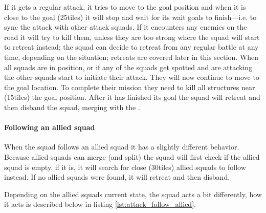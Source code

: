 If it gets a regular attack, it tries to move to the goal position and when it is close to the goal (25\conf tiles) it will stop and wait for its wait goals to finish—i.e. to sync the attack with other attack squads. If it encounters any enemies on the road it will try to kill them, unless they are too strong where the squad will start to retreat instead; the squad can decide to retreat from any regular battle at any time, depending on the situation; retreats are covered later in this section. When all squads are in position, or if any of the squads get spotted and are attacking the other squads start to initiate their attack. They will now continue to move to the goal location. To complete their mission they need to kill all structures near (15\conf tiles) the goal position. After it has finished its goal the squad will retreat and then disband the squad, merging with the .

\paragraph{Following an allied squad}
When the squad follows an allied squad it has a slightly different behavior. Because allied squads can merge (and split) the squad will first check if the allied squad is empty, if it is, it will search for close (30\conf tiles) allied squads to follow instead. If no allied squads were found, it will retreat and then disband.

Depending on the allied squads current state, the squad acts a bit differently, how it acts is described below in listing \ref{lst:attack_follow_allied}.


